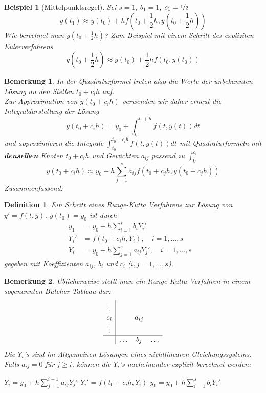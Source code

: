 \documentclass[12pt]{article}
\theoremstyle{break}
\newtheorem{definition}[theorem]{Definition}
\newtheorem*{comment*}{Bemerkung}
\newtheorem{example}[theorem]{Beispiel}
\begin{document}
\begin{example}[Mittelpunktsregel]
Sei $s=1$, $b_1 = 1$, $c_1 = \nicefrac{1}{2}$
$$ y(t_1) \approx y(t_0) + hf(t_0 + \frac{1}{2}h, y(t_0 + \frac{1}{2}h))$$
Wie berechnet man $y(t_0 + \frac{1}{2}h)$?
Zum Beispiel mit einem Schritt des expliziten Eulerverfahrens
$$y(t_0 + \frac{1}{2}h) \approx y(t_0) + \frac{1}{2}hf(t_0, y(t_0))$$
\end{example}

\begin{comment*}
In der Quadraturformel treten also die Werte der unbekannten Lösung an den Stellen $t_0 + c_ih$ auf. \\
Zur Approximation von $y(t_0 + c_ih)$ verwenden wir daher erneut die Integraldarstellung der Lösung
$$y(t_0 + c_ih) = y_0 + \int_{t_0}^{t_0+h} f(t, y(t))dt$$
und approximieren die Integrale $\int_{t_0}^{t_0 + c_ih}f(t, y(t))dt$ mit Quadraturformeln mit \textbf{denselben} Knoten $t_0 + c_ih$ und Gewichten $a_{ij}$ passend zu $\int_0^{c_i}$
$$y(t_0 +c_ih) \approx y_0 + h \sum_{j=1}^s a_{ij} f(t_0 + c_jh, y(t_0 + c_jh))$$
Zusammenfassend:
\end{comment*}

\begin{definition}
Ein Schritt eines Runge-Kutta Verfahrens zur Lösung von $y' = f(t, y)$, $y(t_0) = y_0$ ist durch
\begin{align*}
y_1 &= y_0 + h \sum_{i=1}^s b_i Y_i' &\\
Y_i' &= f(t_0 + c_ih, Y_i), \quad i = 1,...,s &\\
Y_i &= y_0 + h \sum_{j=1}^s a_{ij} Y_j', \quad i=1,...,s
\end{align*}
gegeben mit Koeffizienten $a_{ij}$, $b_i$ und $c_i$ ($i, j = 1,...,s$).
\end{definition}

\begin{comment*}
Üblicherweise stellt man ein Runge-Kutta Verfahren in einem sogenannten Butcher Tableau dar:
$$\begin{array}{c|ccc} \vdots && \\ c_i && a_{ij} & \\ \vdots & & \\ \hline & \hdots & b_j & \hdots \end{array} $$
Die $Y_i$'s sind im Allgemeinen Lösungen eines nichtlinearen Gleichungssystems.\\
Falls $a_{ij} = 0$ für $j \geq i$, können die $Y_i$'s nacheinander explizit berechnet werden:
\begin{algorithmic}
  \STATE $Y_i = y_0 + h \sum_{j=1}^{i-1} a_{ij}Y_j'$
  \STATE $Y_i' = f(t_0 + c_ih, Y_i)$
\ENDFOR
\STATE $y_1 = y_0 + h \sum_{i=1}^s b_i Y_i'$
\end{algorithmic}
\end{comment*}
\end{document}
